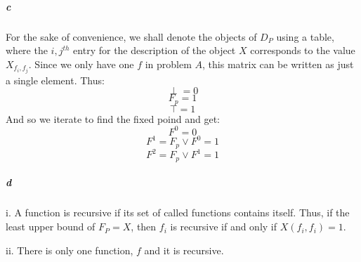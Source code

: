 \documentclass{article}
\begin{document}
\subparagraph{c}
For the sake of convenience, we shall denote the objects of $D_P$ using a table, where the $i,j^{th}$ entry for the description of the object $X$ corresponds to the value $X_{f_i,f_j}$.  Since we only have one $f$ in problem $A$, this matrix can be written as just a single element.  Thus:
\[ \perp = 0 \]
\[ F_p = 1 \]
\[ \top = 1 \]
And so we iterate to find the fixed poind and get:
\[ F^0 = 0 \]
\[ F^1 = F_p \vee F^0 = 1 \]
\[ F^2 = F_p \vee F^1 = 1 \]

\subparagraph{d}
i.  A function is recursive if its set of called functions contains itself.  Thus, if the least upper bound of $F_P = X$, then $f_i$ is recursive if and only if $X(f_i, f_i) = 1$.

ii. There is only one function, $f$ and it is recursive.
\end{document}
